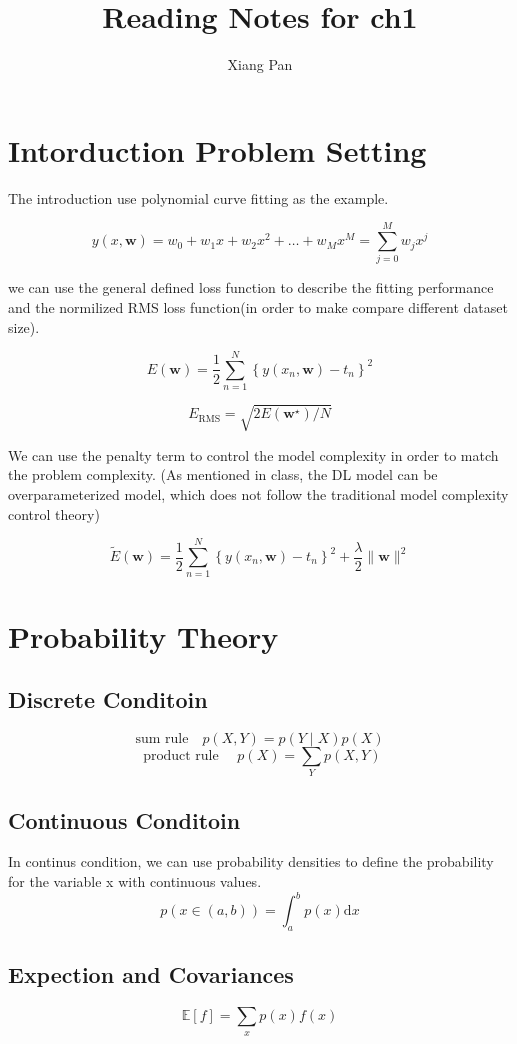 \documentclass[11pt,en,cite=authoryear]{elegantpaper}
\title{Reading Notes for ch1}
\author{Xiang Pan}
\institute{New York University}
\begin{document}
\setlength{\droptitle}{-10em} 
\section{Intorduction Problem Setting}
The introduction use polynomial curve fitting as the example. 

$$y(x, \mathbf{w})=w_{0}+w_{1} x+w_{2} x^{2}+\ldots+w_{M} x^{M}=\sum_{j=0}^{M} w_{j} x^{j}$$

we can use the general defined loss function to describe the fitting performance and the normilized RMS loss function(in order to make compare different dataset size).

$$E(\mathbf{w})=\frac{1}{2} \sum_{n=1}^{N}\left\{y\left(x_{n}, \mathbf{w}\right)-t_{n}\right\}^{2}$$

$$E_{\mathrm{RMS}}=\sqrt{2 E\left(\mathbf{w}^{\star}\right) / N}$$

We can use the penalty term to control the model complexity in order to match the problem complexity. (As mentioned in class, the DL model can be overparameterized model, which does not follow the traditional model complexity control theory)

$$\widetilde{E}(\mathbf{w})=\frac{1}{2} \sum_{n=1}^{N}\left\{y\left(x_{n}, \mathbf{w}\right)-t_{n}\right\}^{2}+\frac{\lambda}{2}\|\mathbf{w}\|^{2}$$

\section{Probability Theory}
\subsection{Discrete Conditoin}

$$\text{sum rule}\quad p(X, Y)=p(Y \mid X) p(X)$$
$$\text { product rule }\quad p(X)=\sum_{Y} p(X, Y)$$


\subsection{Continuous Conditoin}
In continus condition, we can use probability densities to define the probability for the variable x with continuous values.
$$p(x \in(a, b))=\int_{a}^{b} p(x) \mathrm{d} x$$

\subsection{Expection and Covariances}
$$\mathbb{E}[f]=\sum_{x} p(x) f(x)$$
\end{document}
